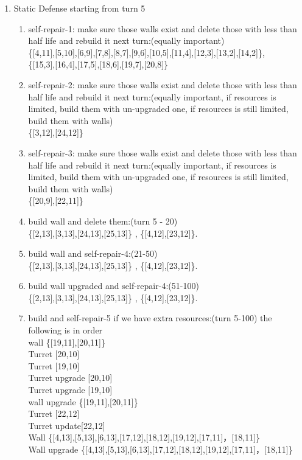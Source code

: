 \documentclass[12pt]{article}
\begin{document}
\begin{enumerate}
     \item Static Defense starting from turn 5
\begin{enumerate}
\item self-repair-1: make sure those walls exist and delete those with less than half life and rebuild it next turn:(equally important)\\ \{[4,11],[5,10],[6,9],[7,8],[8,7],[9,6],[10,5],[11,4],[12,3],[13,2],[14,2]\},\\\{[15,3],[16,4],[17,5],[18,6],[19,7],[20,8]\}
\item self-repair-2: make sure those walls exist and delete those with less than half life and rebuild it next turn:(equally important, if resources is limited, build them with un-upgraded one, if resources is still limited, build them with walls)\\ \{[3,12],[24,12]\}
\item self-repair-3: make sure those walls exist and delete those with less than half life and rebuild it next turn:(equally important, if resources is limited, build them with un-upgraded one, if resources is still limited, build them with walls)\\ \{[20,9],[22,11]\}
\item build wall and delete them:(turn 5 - 20)\\ \{[2,13],[3,13],[24,13],[25,13]\} , \{[4,12],[23,12]\}.
\item build wall and self-repair-4:(21-50)\\ \{[2,13],[3,13],[24,13],[25,13]\} , \{[4,12],[23,12]\}.
\item build wall upgraded and self-repair-4:(51-100)\\ \{[2,13],[3,13],[24,13],[25,13]\} , \{[4,12],[23,12]\}.
\item build and self-repair-5 if we have extra resources:(turn 5-100) the following is in order\\ wall \{[19,11],[20,11]\}\\ Turret [20,10] \\ Turret [19,10] \\ Turret upgrade [20,10] \\ Turret upgrade [19,10] \\ wall upgrade \{[19,11],[20,11]\}\\ Turret [22,12]\\ Turret update[22,12]\\ Wall \{[4,13],[5,13],[6,13],[17,12],[18,12],[19,12],[17,11]，[18,11]\}\\ Wall upgrade \{[4,13],[5,13],[6,13],[17,12],[18,12],[19,12],[17,11]，[18,11]\}\

\end{enumerate}
\end{enumerate}
\end{document}

